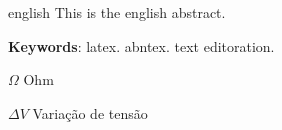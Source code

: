 \documentclass{TCC_UP}
\begin{document}
    \begin{resumo}[Abstract]
     \begin{otherlanguage*}{english}
       This is the english abstract.

       \textbf{Keywords}: latex. abntex. text editoration.
     \end{otherlanguage*}
    \end{resumo}

    \listoffigures*
    \cleardoublepage

    \listofgraficos*
    \cleardoublepage

    \listofquadros*
    \cleardoublepage

    \listoftables*
    \cleardoublepage

    \printnomenclature
    \cleardoublepage

    \begin{simbolos}
      \item[$ \Omega $] Ohm
      \item[$ \Delta V $] Variação de tensão
    \end{simbolos}

    \tableofcontents*
    \cleardoublepage
\end{document}
